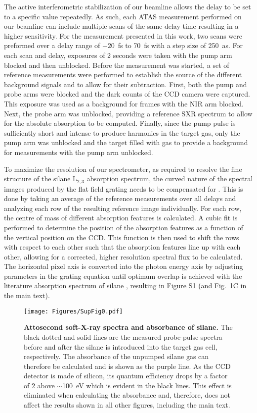 \documentclass[12pt]{article}
\begin{document}
The active interferometric stabilization of our beamline allows the delay to be set to a specific value repeatedly. As such, each ATAS measurement performed on our beamline can include multiple scans of the same delay time resulting in a higher sensitivity. For the measurement presented in this work, two scans were preformed over a delay range of $-20$~fs to 70~fs with a step size of 250~as. For each scan and delay, exposures of 2 seconds were taken with the pump arm blocked and then unblocked. Before the measurement was started, a set of reference measurements were performed to establish the source of the different background signals and to allow for their subtraction. First, both the pump and probe arms were blocked and the dark counts of the CCD camera were captured. This exposure was used as a background for frames with the NIR arm blocked. Next, the probe arm was unblocked, providing a reference SXR spectrum to allow for the absolute absorption to be computed. Finally, since the pump pulse is sufficiently short and intense to produce harmonics in the target gas, only the pump arm was unblocked and the target filled with gas to provide a background for measurements with the pump arm unblocked.

To maximize the resolution of our spectrometer, as required to resolve the fine structure of the silane L$_{2,3}$ absorption spectrum, the curved nature of the spectral images produced by the flat field grating needs to be compensated for \cite{harada99a}. This is done by taking an average of the reference measurements over all delays and analyzing each row of the resulting reference image individually. For each row, the centre of mass of different absorption features is calculated. A cubic fit is performed to determine the position of the absorption features as a function of the vertical position on the CCD. This function is then used to shift the rows with respect to each other such that the absorption features line up with each other, allowing for a corrected, higher resolution spectral flux to be calculated. The horizontal pixel axis is converted into the photon energy axis by adjusting parameters in the grating equation until optimum overlap is achieved with the literature absorption spectrum of silane \cite{puettner97a}, resulting in Figure S1 (and Fig.~1C in the main text).

\begin{figure}
\texttt{[image: Figures/SupFig0.pdf]}
\label{figs1}
\caption{\textbf{Attosecond soft-X-ray spectra and absorbance of silane.} The black dotted and solid lines are the measured probe-pulse spectra before and after the silane is introduced into the target gas cell, respectively. The absorbance of the unpumped silane gas can therefore be calculated and is shown as the purple line. 
As the CCD detector is made of silicon, its quantum efficiency drops by a factor of 2 above $\sim$100~eV which is evident in the black lines. This effect is eliminated when calculating the absorbance and, therefore, does not affect the results shown in all other figures, including the main text.}
\end{figure}
\end{document}
